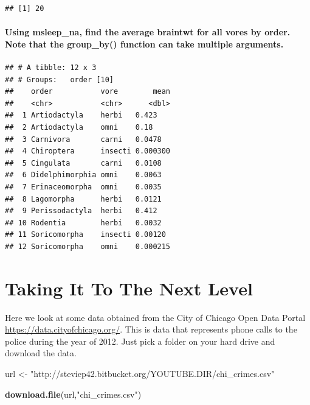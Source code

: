 \documentclass[]{book}
\newenvironment{Shaded}{\begin{snugshade}}{\end{snugshade}}
\newcommand{\KeywordTok}[1]{\textcolor[rgb]{0.13,0.29,0.53}{\textbf{#1}}}
\newcommand{\NormalTok}[1]{#1}
\newcommand{\StringTok}[1]{\textcolor[rgb]{0.31,0.60,0.02}{#1}}
\begin{document}
\begin{verbatim}
## [1] 20
\end{verbatim}

\hypertarget{using-msleep_na-find-the-average-braintwt-for-all-vores-by-order.-note-that-the-group_by-function-can-take-multiple-arguments.}{%
\subsubsection{Using msleep\_na, find the average braintwt for all vores by order. Note that the group\_by() function can take multiple arguments.}\label{using-msleep_na-find-the-average-braintwt-for-all-vores-by-order.-note-that-the-group_by-function-can-take-multiple-arguments.}}

\begin{verbatim}
## # A tibble: 12 x 3
## # Groups:   order [10]
##    order           vore        mean
##    <chr>           <chr>      <dbl>
##  1 Artiodactyla    herbi   0.423   
##  2 Artiodactyla    omni    0.18    
##  3 Carnivora       carni   0.0478  
##  4 Chiroptera      insecti 0.000300
##  5 Cingulata       carni   0.0108  
##  6 Didelphimorphia omni    0.0063  
##  7 Erinaceomorpha  omni    0.0035  
##  8 Lagomorpha      herbi   0.0121  
##  9 Perissodactyla  herbi   0.412   
## 10 Rodentia        herbi   0.0032  
## 11 Soricomorpha    insecti 0.00120 
## 12 Soricomorpha    omni    0.000215
\end{verbatim}

\hypertarget{taking-it-to-the-next-level}{%
\chapter{Taking It To The Next Level}\label{taking-it-to-the-next-level}}

Here we look at some data obtained from the City of Chicago Open Data Portal \url{https://data.cityofchicago.org/}. This is data that represents phone calls to the police during the year of 2012. Just pick a folder on your hard drive and download the data.

\begin{Shaded}
\begin{Highlighting}[]
\NormalTok{url <-}\StringTok{ "http://steviep42.bitbucket.org/YOUTUBE.DIR/chi_crimes.csv"}

\KeywordTok{download.file}\NormalTok{(url,}\StringTok{"chi_crimes.csv"}\NormalTok{)}
\end{Highlighting}
\end{Shaded}


\end{document}
